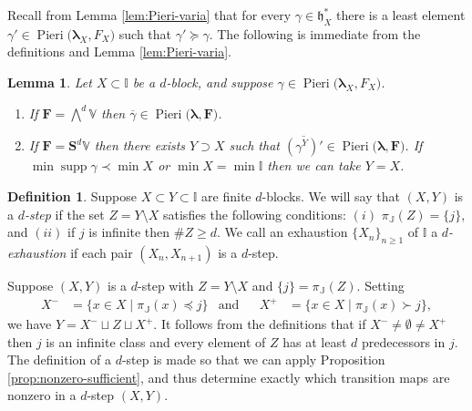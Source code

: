 \documentclass[11pt,fleqn]{amsart}
\newcommand\II{\mathbb I}
\newcommand\JJ{\mathbb J}
\newtheorem{lem}[thm]{Lemma}
\theoremstyle{definition}
\newtheorem{defn}[thm]{Definition}
\theoremstyle{remark}
\theoremstyle{remark}
\newcommand\VV{\mathbb V}
\renewcommand\SS{\mathbf S}
\newcommand\lie[1]{\mathfrak{#1}}
\newcommand\wt[1]{\boldsymbol{#1}}
\DeclareMathOperator\supp{supp}
\newcommand\Pieri[2]{\operatorname{Pieri}{(#1},{#2)}}
\begin{document}
Recall from Lemma \ref{lem:Pieri-varia} that for every $\gamma \in \lie h_X^*$
there is a least element $\gamma' \in \Pieri{\wt\lambda_X}{F_X}$ such that
$\gamma' \succeq \gamma$. The following is immediate from the 
definitions and Lemma \ref{lem:Pieri-varia}.
\begin{lem}
\label{lem:d-compatible-pieri}
Let $X \subset \II$ be a $d$-block, and suppose $\gamma \in 
\Pieri{\wt\lambda_X}{F_X}$.
\begin{enumerate}
  \item If $\mathbf F = \bigwedge^d \VV$ then $\overline{\gamma} \in 
    \Pieri{\wt\lambda}{\mathbf F}$.
  \item If $\mathbf F = \SS^d\VV$ then there exists $Y \supset X$ such that 
    $\overline{(\gamma^Y)'} \in \Pieri{\wt\lambda}{\mathbf F}$. If $\min 
    \supp \gamma \prec \min X$ or $\min X = \min \II$ then we can take $Y = X$.
  \end{enumerate}
\end{lem}

\begin{defn}
Suppose $X \subset Y \subset \II$ are finite $d$-blocks. We will say that
$(X,Y)$ is a \emph{$d$-step} if the set $Z = Y \setminus X$ satisfies the 
following conditions: $(i)$ $\pi_\JJ(Z) = \{j\}$, and $(ii)$ if $j$ is infinite 
then $\# Z \geq d$. We call an exhaustion $\{X_n\}_{n \geq 1}$ of $\II$ a 
\emph{$d$-exhaustion} if each pair $(X_n,X_{n+1})$ is a $d$-step.
\end{defn}

Suppose $(X,Y)$ is a $d$-step with $Z = Y \setminus X$ and $\{j\} = 
\pi_\JJ(Z)$. 
Setting 
\begin{align*}
X^- &= \{x \in X \mid \pi_\JJ(x) \preceq j\}
  &\mbox{and}&
  &X^+ &= \{x \in X \mid \pi_\JJ(x) \succ j\},   
\end{align*}
we have $Y = X^- \sqcup Z \sqcup X^+$. It follows from the definitions that if 
$X^- \neq \emptyset \neq X^+$ then $j$ is an infinite class and every element 
of $Z$ has at least $d$ predecessors in $j$. The definition of a $d$-step is 
made so that we can apply Proposition \ref{prop:nonzero-sufficient}, and thus 
determine exactly which transition maps are nonzero in a $d$-step $(X,Y)$.
\end{document}
